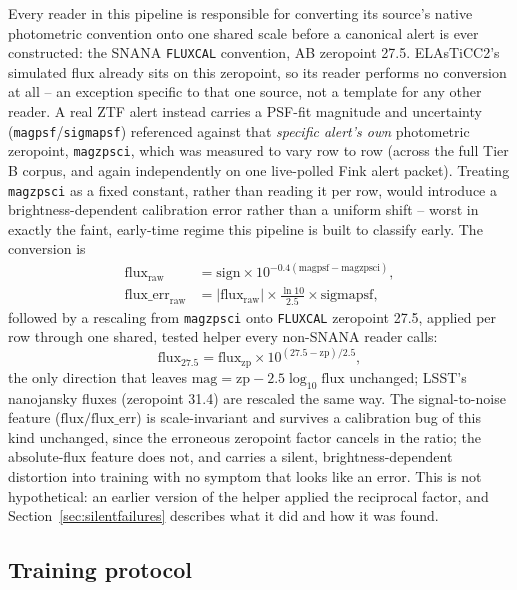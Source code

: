 Every reader in this pipeline is responsible for converting its source's
native photometric convention onto one shared scale before a canonical
alert is ever constructed: the SNANA \texttt{FLUXCAL} convention, AB
zeropoint 27.5. ELAsTiCC2's simulated flux already sits on this zeropoint,
so its reader performs no conversion at all -- an exception specific to
that one source, not a template for any other reader. A real ZTF alert
instead carries a PSF-fit magnitude and uncertainty
(\texttt{magpsf}/\texttt{sigmapsf}) referenced against that \emph{specific
alert's own} photometric zeropoint, \texttt{magzpsci}, which was measured
to vary row to row (across the full Tier B corpus, and again independently
on one live-polled Fink alert packet). Treating \texttt{magzpsci} as a
fixed constant, rather than reading it per row, would introduce a
brightness-dependent calibration error rather than a uniform shift -- worst
in exactly the faint, early-time regime this pipeline is built to classify
early. The conversion is
\begin{align}
  \mathrm{flux}_\mathrm{raw} &= \mathrm{sign} \times 10^{-0.4(\mathrm{magpsf} - \mathrm{magzpsci})}, \\
  \mathrm{flux\_err}_\mathrm{raw} &= |\mathrm{flux}_\mathrm{raw}| \times \frac{\ln 10}{2.5} \times \mathrm{sigmapsf},
\end{align}
followed by a rescaling from \texttt{magzpsci} onto \texttt{FLUXCAL}
zeropoint 27.5, applied per row through one shared, tested helper every
non-SNANA reader calls:
\begin{equation}
  \mathrm{flux}_{27.5} = \mathrm{flux}_\mathrm{zp} \times 10^{(27.5 - \mathrm{zp})/2.5},
\end{equation}
the only direction that leaves $\mathrm{mag} = \mathrm{zp} - 2.5\log_{10}\mathrm{flux}$
unchanged; LSST's nanojansky fluxes (zeropoint 31.4) are rescaled the same
way. The signal-to-noise feature ($\mathrm{flux}/\mathrm{flux\_err}$) is
scale-invariant and survives a calibration bug of this kind unchanged,
since the erroneous zeropoint factor cancels in the ratio; the
absolute-flux feature does not, and carries a silent, brightness-dependent
distortion into training with no symptom that looks like an error. This
is not hypothetical: an earlier version of the helper applied the
reciprocal factor, and Section~\ref{sec:silentfailures} describes what it
did and how it was found.

\subsection{Training protocol}

